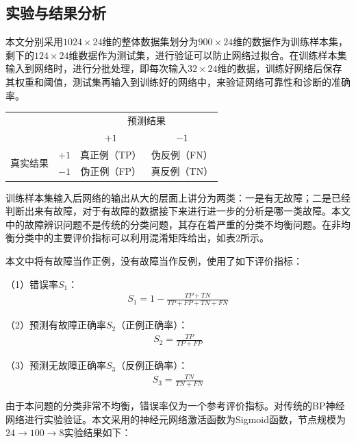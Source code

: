 \documentclass{ctacn}%
\begin{document}
\begin{multicols}{2}

\subsection{实验与结果分析}

本文分别采用$1024\times24$维的整体数据集划分为$900\times24$维的数据作为训练样本集，剩下的$124\times24$维数据作为测试集，进行验证可以防止网络过拟合。在训练样本集输入到网络时，进行分批处理，即每次输入$32\times24$维的数据，训练好网络后保存其权重和阈值，测试集再输入到训练好的网络中，来验证网络可靠性和诊断的准确率。

\begin{center}
	\label{tab:2}
	\begin{tabular} {cccc}\toprule
		\multirow{2}{*}[-2pt]{}&\multirow{2}{*}[-2pt]{}&\multicolumn{2}{c}{预测结果}\\
		\cmidrule(lr){3-4}
		&&$+1$&$-1$\\\hline
		\multirow{2}{*}[-2pt]{真实结果}&$+1$&真正例（TP）&伪反例（FN）\\
		&$-1$&伪正例（FP）&真反例（TN）\\
		\bottomrule
\end{tabular}\end{center}

训练样本集输入后网络的输出从大的层面上讲分为两类：一是有无故障；二是已经判断出来有故障，对于有故障的数据接下来进行进一步的分析是哪一类故障。本文中的故障辨识问题不是传统的分类问题，其存在着严重的分类不均衡问题。在非均衡分类中的主要评价指标可以利用混淆矩阵给出，如表2所示。


本文中将有故障当作正例，没有故障当作反例，使用了如下评价指标：

（1）错误率$S_1$：
\begin{align}
S_1=1-\frac{TP+TN}{TP+FP+TN+FN}
\end{align}


（2）预测有故障正确率$S_2$（正例正确率）：
\begin{align}
S_2=\frac{TP}{TP+FP}
\end{align}

（3）预测无故障正确率$S_3$（反例正确率）：
\begin{align}
S_3=\frac{TN}{TN+FN}
\end{align}

由于本问题的分类非常不均衡，错误率仅为一个参考评价指标。对传统的BP神经网络进行实验验证。本文采用的神经元网络激活函数为Sigmoid函数，节点规模为$24\rightarrow100\rightarrow8$实验结果如下：



\end{multicols}
\end{document}
